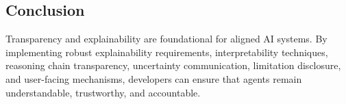 \begin{TNtwocol}
\section{Conclusion}
Transparency and explainability are foundational for aligned AI systems. By implementing robust explainability requirements, interpretability techniques, reasoning chain transparency, uncertainty communication, limitation disclosure, and user-facing mechanisms, developers can ensure that agents remain understandable, trustworthy, and accountable.

\end{TNtwocol}
